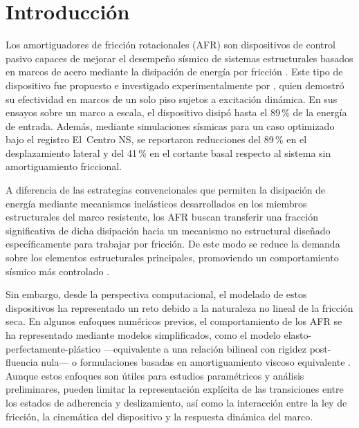 \documentclass[preprint,12pt,authoryear]{elsarticle}
\begin{document}
\section{Introducción}
\label{sec:intro}

Los amortiguadores de fricción rotacionales (AFR) son dispositivos de control
pasivo capaces de mejorar el desempeño sísmico de sistemas estructurales basados
en marcos de acero mediante la disipación de energía por fricción
\citep{pall_friction_1980, pall_response_1982, jaisee_state---art_2021}.
Este tipo de
dispositivo fue propuesto e investigado experimentalmente por \citet{Mualla2002},
quien demostró su efectividad en marcos de un solo piso sujetos a excitación
dinámica. En sus ensayos sobre un marco a escala, el dispositivo disipó hasta el
89\,\% de la energía de entrada. Además, mediante simulaciones sísmicas para un
caso optimizado bajo el registro El~Centro NS, se reportaron reducciones del
89\,\% en el desplazamiento lateral y del 41\,\% en el cortante basal respecto
al sistema sin amortiguamiento friccional.

A diferencia de las estrategias convencionales que permiten la disipación de
energía mediante mecanismos inelásticos desarrollados en los miembros
estructurales del marco resistente, los AFR buscan transferir una fracción
significativa de dicha disipación hacia un mecanismo no estructural diseñado
específicamente para trabajar por fricción. De este modo se reduce la demanda
sobre los elementos estructurales principales, promoviendo un comportamiento
sísmico más controlado \citep{de_domenico_editorial_2020}.

Sin embargo, desde la perspectiva computacional, el modelado de estos
dispositivos ha representado un reto debido a la naturaleza no lineal de la
fricción seca. En algunos enfoques numéricos previos, el comportamiento de los
AFR se ha representado mediante modelos simplificados, como el modelo
elasto-perfectamente-plástico ---equivalente a una relación bilineal con
rigidez post-fluencia nula--- o formulaciones basadas en amortiguamiento viscoso
equivalente \citep{lee_seismic_2025, Jarrahi2020jbe}. Aunque estos enfoques son
útiles para estudios paramétricos y análisis preliminares, pueden limitar la
representación explícita de las transiciones entre los estados de adherencia y
deslizamiento, así como la interacción entre la ley de fricción, la cinemática
del dispositivo y la respuesta dinámica del marco.
\end{document}
